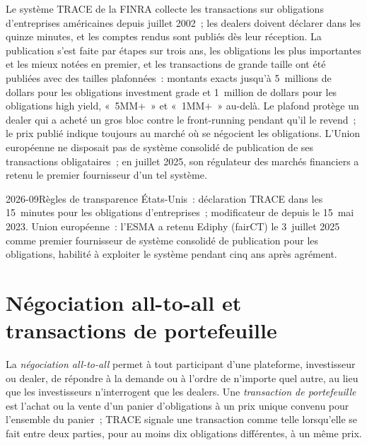 Le système TRACE de la FINRA collecte les transactions sur obligations d'entreprises américaines depuis juillet 2002~;
les dealers doivent déclarer dans les quinze minutes, et les comptes rendus sont publiés dès leur
réception. La publication s'est faite par étapes sur trois ans, les obligations les plus importantes et les mieux notées
en premier, et les transactions de grande taille ont été publiées avec des tailles plafonnées~: montants exacts
jusqu'à 5~millions de dollars pour les obligations investment grade et 1~million de dollars pour les obligations high yield, «~5MM$+$~»
et «~1MM$+$~» au-delà. Le plafond protège un dealer qui a acheté un gros
bloc contre le front-running pendant qu'il le revend~; le prix publié indique toujours au marché
où se négocient les obligations. L'Union européenne ne disposait pas de système consolidé de publication de ses
transactions obligataires~; en juillet 2025, son régulateur des marchés financiers a retenu le premier fournisseur d'un tel système.

\begin{dated}{2026-09}{Règles de transparence}\label{dat:m2:how-bonds-trade:transparency}
États-Unis~: déclaration TRACE dans les 15~minutes pour les obligations d'entreprises~;
modificateur de  depuis le 15~mai 2023. Union européenne~: l'ESMA a retenu Ediphy
(fairCT) le 3~juillet 2025 comme premier fournisseur de système consolidé de publication pour les obligations, habilité à exploiter le système
pendant cinq ans après agrément.
\end{dated}

\section{Négociation all-to-all et transactions de portefeuille}

\begin{definition}\label{def:m2:how-bonds-trade:a2a}
La \emph{négociation all-to-all} permet à tout participant d'une
plateforme, investisseur ou dealer, de répondre à la demande ou à l'ordre de n'importe quel autre, au lieu
que les investisseurs n'interrogent que les dealers. Une \emph{transaction de portefeuille} est l'achat ou la vente
d'un panier d'obligations à un prix unique convenu pour l'ensemble du panier~; TRACE
signale une transaction comme telle lorsqu'elle se fait entre deux parties, pour au moins dix
obligations différentes, à un même prix.
\end{definition}

